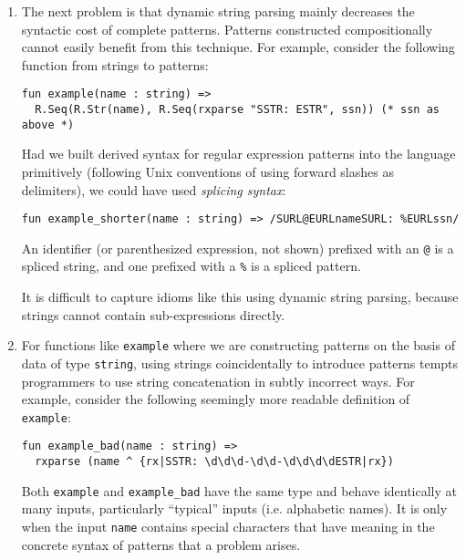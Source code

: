 \begin{enumerate}
\item The next problem is that dynamic string parsing mainly decreases the syntactic cost of complete patterns. Patterns constructed compositionally cannot easily benefit from this technique. For example, consider the following function from strings to patterns:
\begin{lstlisting}[numbers=none]
fun example(name : string) => 
  R.Seq(R.Str(name), R.Seq(rxparse "SSTR: ESTR", ssn)) (* ssn as above *)
\end{lstlisting}
Had we built derived syntax for regular expression patterns into the language primitively (following Unix conventions of using forward slashes as delimiters), we could have used \emph{splicing syntax}:
\begin{lstlisting}[numbers=none]
fun example_shorter(name : string) => /SURL@EURLnameSURL: %EURLssn/
\end{lstlisting}
An identifier (or parenthesized expression, not shown) prefixed with an \lstinline{@} is a spliced string, and one prefixed with a \lstinline{%} is a spliced pattern.

It is difficult to capture idioms like this using dynamic string parsing, because strings cannot contain sub-expressions directly. 


\item For functions like \lstinline{example} where we are constructing patterns on the basis of data of type \lstinline{string}, using strings coincidentally to introduce patterns tempts programmers to use string concatenation in subtly incorrect ways. For example, consider the following seemingly more readable definition of \lstinline{example}:
\begin{lstlisting}[numbers=none,escapechar=~]
fun example_bad(name : string) => 
  rxparse (name ^ {rx|SSTR: \d\d\d-\d\d-\d\d\d\dESTR|rx})
\end{lstlisting}

Both \lstinline{example} and \lstinline{example_bad} have the same type and behave identically at many inputs, particularly ``typical'' inputs (i.e. alphabetic names). It is only when the input \lstinline{name} contains special characters that have meaning in the concrete syntax of patterns that a problem arises. 


\end{enumerate}
